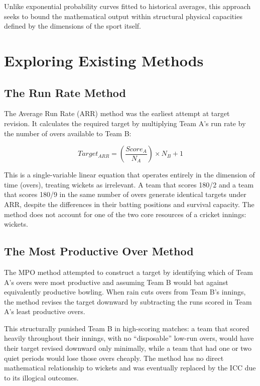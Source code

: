 \documentclass[12pt, letterpaper, fleqn]{article}
\begin{document}
\indent Unlike exponential probability curves fitted to historical averages, this approach seeks to bound the mathematical output within structural physical capacities defined by the dimensions of the sport itself.

\section{Exploring Existing Methods}

\subsection{The Run Rate Method}

\indent The Average Run Rate (ARR) method was the earliest attempt at target revision. It calculates the required target by multiplying Team A's run rate by the number of overs available to Team B:

\begin{equation}
Target_{ARR} = \left( \frac{Score_A}{N_A} \right) \times N_B + 1
\end{equation}

\indent This is a single-variable linear equation that operates entirely in the dimension of time (overs), treating wickets as irrelevant. A team that scores 180/2 and a team that scores 180/9 in the same number of overs generate identical targets under ARR, despite the differences in their batting positions and survival capacity. The method does not account for one of the two core resources of a cricket innings: wickets.

\subsection{The Most Productive Over Method}

\indent The MPO method attempted to construct a target by identifying which of Team A's overs were most productive and assuming Team B would bat against equivalently productive bowling. When rain cuts overs from Team B's innings, the method revises the target downward by subtracting the runs scored in Team A's least productive overs. 

\indent This structurally punished Team B in high-scoring matches: a team that scored heavily throughout their innings, with no ``disposable'' low-run overs, would have their target revised downward only minimally, while a team that had one or two quiet periods would lose those overs cheaply. The method has no direct mathematical relationship to wickets and was eventually replaced by the ICC due to its illogical outcomes.
\end{document}
